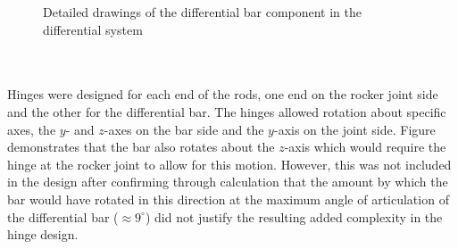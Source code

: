         \begin{figure}[h!]
        \centering
        \caption[Detailed drawings of the differential bar component in the differential system]{Detailed drawings of the differential bar component in the differential system}
        \label{fig:mechDesign-differentialBarDetail}
        \end{figure}
        
        
      \\\\
        Hinges were designed for each end of the rods, one end on the rocker joint side and the other for the differential bar. The hinges allowed rotation about specific axes, the $y$- and $z$-axes on the bar side and the $y$-axis on the joint side. Figure~ demonstrates that the bar also rotates about the $z$-axis which would require the hinge at the rocker joint to allow for this motion. However, this was not included in the design after confirming through calculation that the amount by which the bar would have rotated in this direction at the maximum angle of articulation of the differential bar ($\approx9^\circ$) did not justify the resulting added complexity in the hinge design.
        
